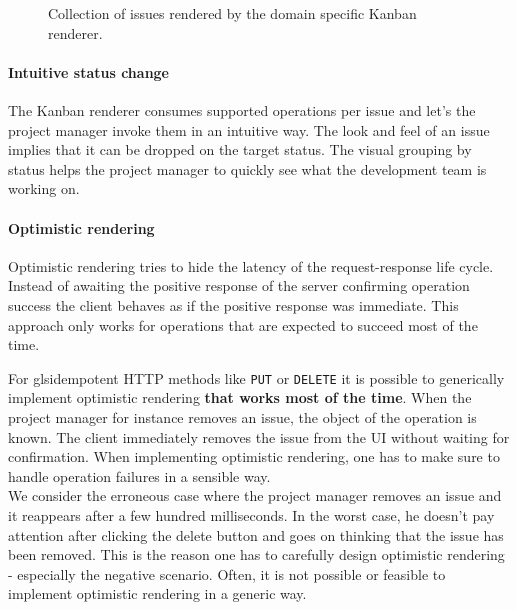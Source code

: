 \begin{figure}[!htb]
  \caption{Collection of issues rendered by the domain specific Kanban renderer.}
  \label{fig:kanban}
\end{figure}

\paragraph{Intuitive status change}
The Kanban renderer consumes supported operations per issue and let's the project manager invoke them in an intuitive way. The look and feel of an issue implies that it can be dropped on the target status. The visual grouping by status helps the project manager to quickly see what the development team is working on.

\paragraph{Optimistic rendering}
Optimistic rendering tries to hide the latency of the request-response life cycle. Instead of awaiting the positive response of the server confirming operation success the client behaves as if the positive response was immediate. This approach only works for operations that are expected to succeed most of the time.

For gls{idempotent} HTTP methods like \lstinline{PUT} or \lstinline{DELETE} it is possible to generically implement optimistic rendering \textbf{that works most of the time}. When the project manager for instance removes an issue, the object of the operation is known. The client immediately removes the issue from the UI without waiting for confirmation. When implementing optimistic rendering, one has to make sure to handle operation failures in a sensible way. \\
We consider the erroneous case where the project manager removes an issue and it reappears after a few hundred milliseconds. In the worst case, he doesn't pay attention after clicking the delete button and goes on thinking that the issue has been removed. This is the reason one has to carefully design optimistic rendering - especially the negative scenario. Often, it is not possible or feasible to implement optimistic rendering in a generic way.


